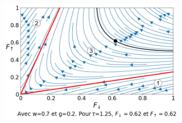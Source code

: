 \documentclass[12pt]{article}
\begin{document}
\begin{figure}[H]
    \centering
    \begin{subfigure}{0.63\textwidth}
      \centering
      \includegraphics[width=1\textwidth]{Graphe/Figure W=quelque et g quelquonque.png}
      \captionsetup{width=.85\textwidth}
      \caption{} 
      \label{fig:Sub_Graphe_W=0.7}
    \end{subfigure}
    \begin{subfigure}{0.32\textwidth}
        \centering

\end{subfigure}
\end{figure}
\end{document}
